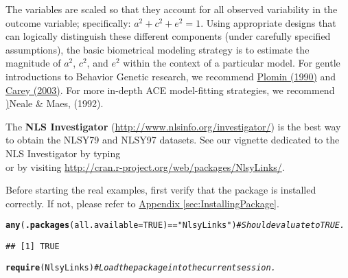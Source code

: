 \documentclass{article}\usepackage[]{graphicx}\usepackage[]{color}
\makeatletter
\newcommand{\hlnum}[1]{\textcolor[rgb]{0.686,0.059,0.569}{#1}}%
\newcommand{\hlstr}[1]{\textcolor[rgb]{0.192,0.494,0.8}{#1}}%
\newcommand{\hlcom}[1]{\textcolor[rgb]{0.678,0.584,0.686}{\textit{#1}}}%
\newcommand{\hlopt}[1]{\textcolor[rgb]{0,0,0}{#1}}%
\newcommand{\hlstd}[1]{\textcolor[rgb]{0.345,0.345,0.345}{#1}}%
\newcommand{\hlkwc}[1]{\textcolor[rgb]{0.333,0.667,0.333}{#1}}%
\newcommand{\hlkwd}[1]{\textcolor[rgb]{0.737,0.353,0.396}{\textbf{#1}}}%
\newenvironment{kframe}{%
 \def\at@end@of@kframe{}%
 \ifinner\ifhmode%
  \def\at@end@of@kframe{\end{minipage}}%
  \begin{minipage}{\columnwidth}%
 \fi\fi%
 \def\FrameCommand##1{\hskip\@totalleftmargin \hskip-\fboxsep
 \colorbox{shadecolor}{##1}\hskip-\fboxsep
     \hskip-\linewidth \hskip-\@totalleftmargin \hskip\columnwidth}%
 \MakeFramed {\advance\hsize-\width
   \@totalleftmargin\z@ \linewidth\hsize
   \@setminipage}}%
 {\par\unskip\endMakeFramed%
 \at@end@of@kframe}
\newenvironment{knitrout}{}{} %
\makeatother
\begin{document}
The variables are scaled so that they account for all observed variability in the outcome variable; specifically: $a^2 + c^2 + e^2 = 1$.  Using appropriate designs that can logically distinguish these different components (under carefully specified assumptions), the basic biometrical modeling strategy is to estimate the magnitude of $a^2$, $c^2$, and $e^2$ within the context of a particular model. For gentle introductions to Behavior Genetic research, we recommend \href{http://books.google.com/books?id=r7AgAQAAIAAJ&source=gbs_navlinks_s}{Plomin (1990)} and \href{http://psych.colorado.edu/~carey/hgss/}{Carey (2003)}.  For more in-depth ACE model-fitting strategies, we recommend \href{http://www.vipbg.vcu.edu/OpenMxFall09/NMbook05.pdf}){Neale \& Maes, (1992)}. 


The \textbf{NLS Investigator}\label{term:NlsInvestigator} (\url{http://www.nlsinfo.org/investigator/}) is the best way to obtain the NLSY79 and NLSY97 datasets.  See our vignette dedicated to the NLS Investigator by typing\\  or by visiting \url{http://cran.r-project.org/web/packages/NlsyLinks/}.

Before starting the real examples, first verify that the  package is installed correctly.  If not, please refer to \hyperref[sec:InstallingPackage]{Appendix \ref*{sec:InstallingPackage}}.
\begin{knitrout}
\color{fgcolor}\begin{kframe}
\begin{alltt}
\hlkwd{any}\hlstd{(}\hlkwd{.packages}\hlstd{(}\hlkwc{all.available} \hlstd{=} \hlnum{TRUE}\hlstd{)} \hlopt{==} \hlstr{"NlsyLinks"}\hlstd{)}  \hlcom{#Should evaluate to TRUE.}
\end{alltt}
\begin{verbatim}
## [1] TRUE
\end{verbatim}
\begin{alltt}
\hlkwd{require}\hlstd{(NlsyLinks)}  \hlcom{#Load the package into the current session.}
\end{alltt}


{\ttfamily\noindent\itshape\color{messagecolor}{\#\# Loading required package: NlsyLinks}}\end{kframe}
\end{knitrout}
\end{document}

